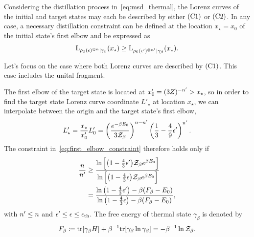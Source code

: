 \documentclass[pra,
aps,
twocolumn,
superscriptaddress,
groupedaddress,
nofootinbib,
reprint
]{revtex4-1}
\begin{document}
Considering the distillation process in~\cref{eq:msd_thermal}, the Lorenz curves of the initial and target states may each be described by either $\rm{(C1)}$ or $\rm{(C2)}$.
In any case, a necessary distillation constraint can be defined at the location $x_\star = x_0$ of the initial state's first elbow and be expressed as
\begin{equation}\label{eq:first_elbow_constraint}
	\lc{\noisys(\epsilon)\too{n}}{\gamma_\beta}(x_\star) \geq \lc{\noisys(\epsilon')\too{\tt}}{\gamma_\beta}(x_\star).
\end{equation}

Let's focus on the case where both Lorenz curves are described by $\rm{(C1)}$.
This case includes the unital fragment.

The first elbow of the target state is located at $x'_0 = (3Z)^{-\tt} > x_\star$, so in order to find the target state Lorenz curve coordinate $L'_\star$ at location $x_\star$, we can interpolate between the origin and the target state's first elbow, 
\begin{equation}\label{eq:constraint_deriv_temp}
	L'_\star = \frac{x_\star}{x'_0}L'_0 = \left(\frac{e^{-\beta E_0}}{3\Z_\beta}\right)^{n-\tt} \left( \frac{1}{3} - \frac{4}{9} \epsilon' \right)^{\tt}.
\end{equation}
The constraint in~\cref{eq:first_elbow_constraint} therefore holds only if
\begin{align}
	\frac{n}{n'} &\geq \frac{\ln{\Big[ \big( 1-\frac{4}{3}\epsilon' \big)\Z_\beta  e^{\beta E_0} \Big]}}{\ln{\Big[ \big( 1-\frac{4}{3}\epsilon \big)\Z_\beta e^{\beta E_0} \Big]}} \\
	&= \frac{\ln{\big( 1-\frac{4}{3}\epsilon' \big)} - \beta (F_\beta - E_0)}{\ln{\big( 1-\frac{4}{3}\epsilon \big)} - \beta (F_\beta - E_0)},
\end{align}
with $\tt \leq n$ and $\epsilon' \leq \epsilon \leq \epsilon_{\rm{th}}$. 
The free energy of thermal state $\gamma_\beta$ is denoted by
\begin{equation}
	F_\beta \coloneqq \tr[\gamma_\beta H] + \beta^{-1} \tr[\gamma_\beta \ln{\gamma_\beta}] = -\beta^{-1} \ln{\Z_\beta}.
\end{equation}
\end{document}
